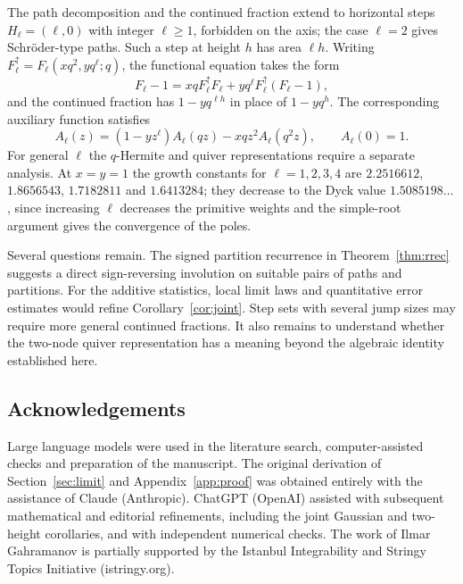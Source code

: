 \documentclass[11pt,reqno]{amsart}
\numberwithin{equation}{section}
\theoremstyle{remark}
\begin{document}
The path decomposition and the continued fraction extend to horizontal steps
$H_\ell=(\ell,0)$ with integer $\ell\ge1$, forbidden on the axis; the case $\ell=2$ gives
Schr\"oder-type paths. Such a step at height $h$ has area $\ell h$. Writing
$F_\ell^\uparrow=F_\ell(xq^2,yq^\ell;q)$, the functional equation takes the form
\[
F_\ell-1=xqF_\ell^\uparrow F_\ell+yq^\ell F_\ell^\uparrow(F_\ell-1),
\]
and the continued fraction has $1-yq^{\ell h}$ in place of $1-yq^h$. The corresponding
auxiliary function satisfies
\[
A_\ell(z)=(1-yz^\ell)A_\ell(qz)-xqz^2A_\ell(q^2z),\qquad A_\ell(0)=1.
\]
For general $\ell$ the $q$-Hermite and quiver representations require a separate
analysis. At $x=y=1$ the growth constants for $\ell=1,2,3,4$ are $2.2516612$,
$1.8656543$, $1.7182811$ and $1.6413284$; they decrease to the Dyck value
$1.5085198\ldots$, since increasing $\ell$ decreases the primitive weights and the
simple-root argument gives the convergence of the poles.

Several questions remain. The signed partition recurrence in Theorem~\ref{thm:rrec}
suggests a direct sign-reversing involution on suitable pairs of paths and partitions.
For the additive statistics, local limit laws and quantitative error estimates would
refine Corollary~\ref{cor:joint}. Step sets with several jump sizes may require more
general continued fractions. It also remains to understand whether the two-node quiver
representation has a meaning beyond the algebraic identity established here.

\subsection*{Acknowledgements}
Large language models were used in the literature search, computer-assisted checks and
preparation of the manuscript. The original derivation of Section~\ref{sec:limit} and
Appendix~\ref{app:proof} was obtained entirely with the assistance of Claude (Anthropic). ChatGPT (OpenAI) assisted with
subsequent mathematical and editorial refinements, including the joint Gaussian and
two-height corollaries, and with independent numerical checks. The work of Ilmar
Gahramanov is partially supported by the Istanbul Integrability and Stringy
Topics Initiative (istringy.org).

\appendix
\end{document}
